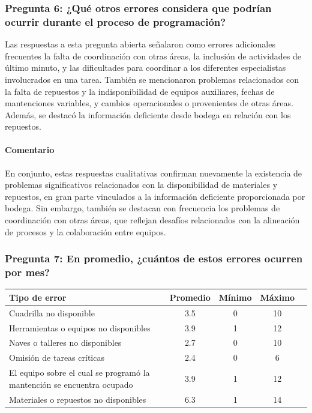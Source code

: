 \documentclass{article}
\begin{document}
\begin{appendix}
    \vspace{1.5em}
    \subsubsection*{Pregunta 6: ¿Qué otros errores considera que podrían ocurrir durante el proceso de programación?}
    
    Las respuestas a esta pregunta abierta señalaron como errores adicionales frecuentes la falta de coordinación con otras áreas, la inclusión de actividades de último minuto, y las dificultades para coordinar a los diferentes especialistas involucrados en una tarea. También se mencionaron problemas relacionados con la falta de repuestos y la indisponibilidad de equipos auxiliares, fechas de mantenciones variables, y cambios operacionales o provenientes de otras áreas. Además, se destacó la información deficiente desde bodega en relación con los repuestos.
    
    \paragraph{Comentario} En conjunto, estas respuestas cualitativas confirman nuevamente la existencia de problemas significativos relacionados con la disponibilidad de materiales y repuestos, en gran parte vinculados a la información deficiente proporcionada por bodega. Sin embargo, también se destacan con frecuencia los problemas de coordinación con otras áreas, que reflejan desafíos relacionados con la alineación de procesos y la colaboración entre equipos.
    
    \vspace{1.5em}
    \subsubsection*{Pregunta 7: En promedio, ¿cuántos de estos errores ocurren por mes?}
    
    \begin{table}[H]
        \centering
        \begin{tabular}{p{7cm}cccc}
            \toprule
            \textbf{Tipo de error} & \textbf{Promedio} & \textbf{Mínimo} & \textbf{Máximo} \\
            \midrule
            Cuadrilla no disponible & 3.5 & 0 & 10 \\
            Herramientas o equipos no disponibles & 3.9 & 1 & 12 \\
            Naves o talleres no disponibles & 2.7 & 0 & 10 \\
            Omisión de tareas críticas & 2.4 & 0 & 6 \\
            El equipo sobre el cual se programó la mantención se encuentra ocupado & 3.9 & 1 & 12 \\
            Materiales o repuestos no disponibles & 6.3 & 1 & 14 \\
            \bottomrule
        \end{tabular}
        \label{tab:errores_especificos}
    \end{table}
    

\end{appendix}
\end{document}

